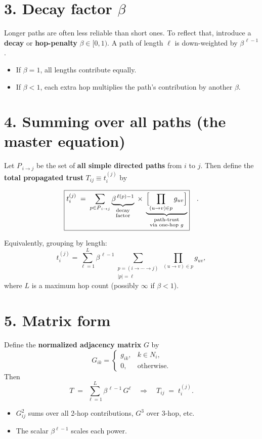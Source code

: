 \documentclass{article}
\begin{document}
\section*{3. Decay factor \(\beta\)}

Longer paths are often less reliable than short ones.  To reflect that, introduce a \textbf{decay} or \textbf{hop-penalty} \(\beta\in[0,1)\).  A path of length \(\ell\) is down-weighted by \(\beta^{\,\ell-1}\).  
\begin{itemize}
    \item If \(\beta=1\), all lengths contribute equally.  
    \item If \(\beta<1\), each extra hop multiplies the path's contribution by another \(\beta\).
\end{itemize}

\section*{4. Summing over all paths (the master equation)}

Let \(P_{\,i\to j}\) be the set of \textbf{all simple directed paths} from \(i\) to \(j\).  Then define the \textbf{total propagated trust} \(T_{ij}\equiv t_i^{(j)}\) by

\[
  \boxed{
  t_i^{(j)}
  \;=\;
  \sum_{p\in P_{\,i\to j}}
    \underbrace{\beta^{\,\ell(p)-1}}_{\substack{\text{decay}\\\text{factor}}}
    \;\times\;
    \underbrace{\Bigl[\prod_{(u\to v)\in p}g_{u v}\Bigr]}_{\substack{\text{path-trust}\\\text{via one-hop }g}}
  }
  \quad.
\]

Equivalently, grouping by length:
\[
  t_i^{(j)}
  = 
  \sum_{\ell=1}^{L}
    \beta^{\,\ell-1}
    \sum_{\substack{p=(i\to\cdots\to j)\\|p|=\ell}}
      \prod_{(u\to v)\in p}g_{u v},
\]
where \(L\) is a maximum hop count (possibly \(\infty\) if \(\beta<1\)).

\section*{5. Matrix form}

Define the \textbf{normalized adjacency matrix} \(G\) by
\[
  G_{ik} =
  \begin{cases}
    g_{ik}, & k\in N_i,\\
    0, & \text{otherwise}.
  \end{cases}
\]
Then
\[
  T \;=\;
  \sum_{\ell=1}^L \beta^{\,\ell-1}\,G^\ell
  \quad\Longrightarrow\quad
  T_{ij} \;=\; t_i^{(j)}.
\]
\begin{itemize}
    \item \(G^2_{ij}\) sums over all 2-hop contributions, \(G^3\) over 3-hop, etc.  
    \item The scalar \(\beta^{\ell-1}\) scales each power.
\end{itemize}
\end{document}
